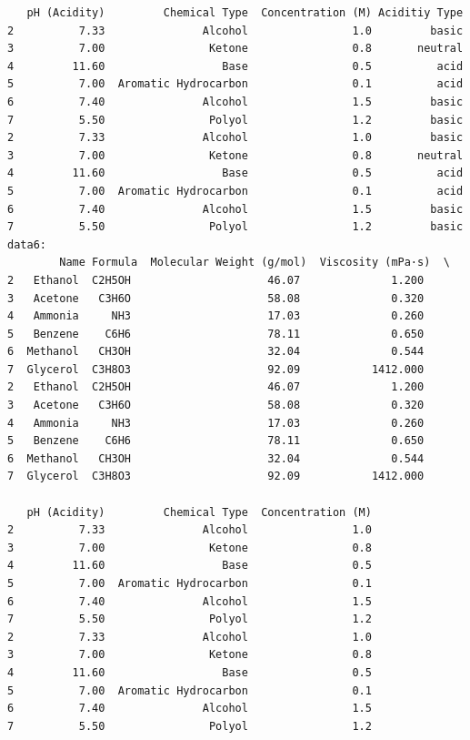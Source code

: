 \documentclass[
  letterpaper,
  DIV=11,
  numbers=noendperiod]{scrreprt}
\begin{document}
\begin{verbatim}
   pH (Acidity)         Chemical Type  Concentration (M) Aciditiy Type  
2          7.33               Alcohol                1.0         basic  
3          7.00                Ketone                0.8       neutral  
4         11.60                  Base                0.5          acid  
5          7.00  Aromatic Hydrocarbon                0.1          acid  
6          7.40               Alcohol                1.5         basic  
7          5.50                Polyol                1.2         basic  
2          7.33               Alcohol                1.0         basic  
3          7.00                Ketone                0.8       neutral  
4         11.60                  Base                0.5          acid  
5          7.00  Aromatic Hydrocarbon                0.1          acid  
6          7.40               Alcohol                1.5         basic  
7          5.50                Polyol                1.2         basic  
data6: 
        Name Formula  Molecular Weight (g/mol)  Viscosity (mPa·s)  \
2   Ethanol  C2H5OH                     46.07              1.200   
3   Acetone   C3H6O                     58.08              0.320   
4   Ammonia     NH3                     17.03              0.260   
5   Benzene    C6H6                     78.11              0.650   
6  Methanol   CH3OH                     32.04              0.544   
7  Glycerol  C3H8O3                     92.09           1412.000   
2   Ethanol  C2H5OH                     46.07              1.200   
3   Acetone   C3H6O                     58.08              0.320   
4   Ammonia     NH3                     17.03              0.260   
5   Benzene    C6H6                     78.11              0.650   
6  Methanol   CH3OH                     32.04              0.544   
7  Glycerol  C3H8O3                     92.09           1412.000   

   pH (Acidity)         Chemical Type  Concentration (M)  
2          7.33               Alcohol                1.0  
3          7.00                Ketone                0.8  
4         11.60                  Base                0.5  
5          7.00  Aromatic Hydrocarbon                0.1  
6          7.40               Alcohol                1.5  
7          5.50                Polyol                1.2  
2          7.33               Alcohol                1.0  
3          7.00                Ketone                0.8  
4         11.60                  Base                0.5  
5          7.00  Aromatic Hydrocarbon                0.1  
6          7.40               Alcohol                1.5  
7          5.50                Polyol                1.2  
\end{verbatim}
\end{document}
